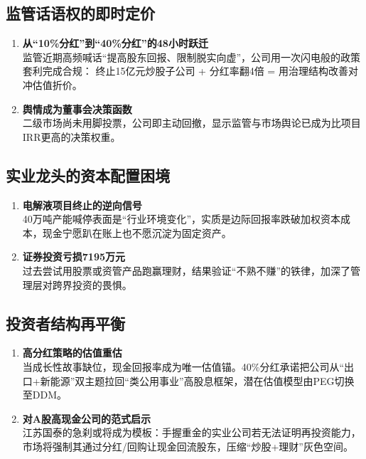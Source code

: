 \subsection{监管话语权的即时定价}
\begin{enumerate}[leftmargin=*, nosep]
    \item \textbf{从“10\%分红”到“40\%分红”的48小时跃迁}  \\
    监管近期高频喊话“提高股东回报、限制脱实向虚”，公司用一次闪电般的政策套利完成合规：  
    终止15亿元炒股子公司 + 分红率翻4倍 = 用治理结构改善对冲估值折价。  
    \item \textbf{舆情成为董事会决策函数}  \\
    二级市场尚未用脚投票，公司即主动回撤，显示监管与市场舆论已成为比项目IRR更高的决策权重。
\end{enumerate}

\subsection{实业龙头的资本配置困境}
\begin{enumerate}[leftmargin=*, nosep]
    \item \textbf{电解液项目终止的逆向信号}  \\
    40万吨产能喊停表面是“行业环境变化”，实质是边际回报率跌破加权资本成本，现金宁愿趴在账上也不愿沉淀为固定资产。  
    \item \textbf{证券投资亏损7195万元}  \\
    过去尝试用股票或资管产品跑赢理财，结果验证“不熟不赚”的铁律，加深了管理层对跨界投资的畏惧。
\end{enumerate}

\subsection{投资者结构再平衡}
\begin{enumerate}[leftmargin=*, nosep]
    \item \textbf{高分红策略的估值重估}  \\
    当成长性故事缺位，现金回报率成为唯一估值锚。40\%分红承诺把公司从“出口+新能源”双主题拉回“类公用事业”高股息框架，潜在估值模型由PEG切换至DDM。  
    \item \textbf{对A股高现金公司的范式启示}  \\
    江苏国泰的急刹或将成为模板：手握重金的实业公司若无法证明再投资能力，市场将强制其通过分红/回购让现金回流股东，压缩“炒股+理财”灰色空间。
\end{enumerate}
